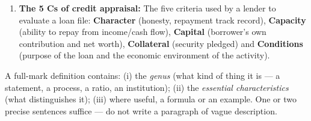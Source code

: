 \documentclass[11pt]{article}
\begin{document}
\begin{corrige}
\begin{enumerate}
\item \textbf{The 5 Cs of credit appraisal:} The five criteria used by a lender to evaluate a loan file: \textbf{Character} (honesty, repayment track record), \textbf{Capacity} (ability to repay from income/cash flow), \textbf{Capital} (borrower's own contribution and net worth), \textbf{Collateral} (security pledged) and \textbf{Conditions} (purpose of the loan and the economic environment of the activity).
\end{enumerate}

\begin{methode}
A full-mark definition contains: (i) the \emph{genus} (what kind of thing it is — a statement, a process, a ratio, an institution); (ii) the \emph{essential characteristics} (what distinguishes it); (iii) where useful, a formula or an example. One or two precise sentences suffice — do not write a paragraph of vague description.
\end{methode}
\end{corrige}
\end{document}
